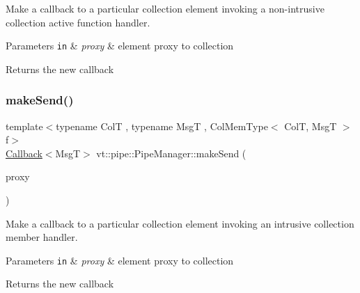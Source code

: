 Make a callback to a particular collection element invoking a non-\/intrusive collection active function handler. 


\begin{DoxyParams}[1]{Parameters}
\mbox{\tt in}  & {\em proxy} & element proxy to collection\\
\hline
\end{DoxyParams}
\begin{DoxyReturn}{Returns}
the new callback 
\end{DoxyReturn}
\mbox{\label{structvt_1_1pipe_1_1_pipe_manager_a87e25e6a0151c0a9a48b58e6f4679b02}} 
\subsubsection{\texorpdfstring{make\+Send()}{makeSend()}\hspace{0.1cm}{\footnotesize\ttfamily [5/6]}}
{\footnotesize\ttfamily template$<$typename ColT , typename MsgT , Col\+Mem\+Type$<$ Col\+T, Msg\+T $>$ f$>$ \\
\hyperlink{namespacevt_a36db99df4c973d48b1118a293fff533f}{Callback}$<$MsgT$>$ vt\+::pipe\+::\+Pipe\+Manager\+::make\+Send (\begin{DoxyParamCaption}\item[{typename Col\+T\+::\+Proxy\+Type}]{proxy }\end{DoxyParamCaption})}



Make a callback to a particular collection element invoking an intrusive collection member handler. 


\begin{DoxyParams}[1]{Parameters}
\mbox{\tt in}  & {\em proxy} & element proxy to collection\\
\hline
\end{DoxyParams}
\begin{DoxyReturn}{Returns}
the new callback 
\end{DoxyReturn}
\mbox{\label{structvt_1_1pipe_1_1_pipe_manager_aa5d48a3b64820bec240a6a61bdfb4524}} 
